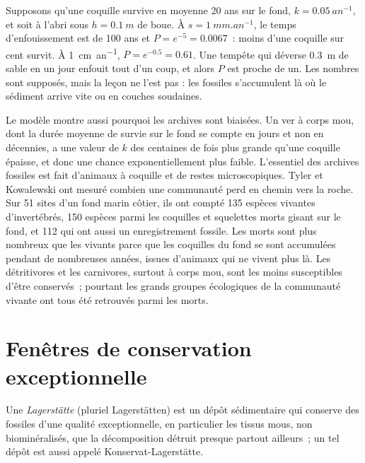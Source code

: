 \begin{example}\label{ex:b2:palaeoenvironments:shell} Supposons
qu'une coquille survive en moyenne 20 ans sur le fond, $k = \qty{0.05}{an^{-1}}$, et soit à
l'abri sous $h = \qty{0.1}{m}$ de boue. À $s = \qty{1}{mm.an^{-1}}$, le temps d'enfouissement
est de 100 ans et $P = e^{-5} = 0.0067$~: moins d'une coquille sur cent survit. À \qty{1}{cm.an^{-1}},
$P = e^{-0.5} = 0.61$. Une tempête qui déverse \qty{0.3}{m} de sable en un jour enfouit
tout d'un coup, et alors $P$ est proche de un. Les nombres sont supposés, mais la leçon ne
l'est pas : les fossiles s'accumulent là où le sédiment arrive vite ou en couches soudaines.
\end{example}

Le modèle montre aussi pourquoi les archives sont biaisées. Un ver à corps mou, dont la durée moyenne de
survie sur le fond se compte en jours et non en décennies, a une valeur de $k$ des centaines de fois plus
grande qu'une coquille épaisse, et donc une chance exponentiellement plus faible. L'essentiel des archives
fossiles est fait d'animaux à coquille et de restes microscopiques. Tyler et Kowalewski ont mesuré combien
une communauté perd en chemin vers la roche. Sur 51 sites d'un fond marin côtier, ils ont compté 135
espèces vivantes d'invertébrés, 150 espèces parmi les coquilles et squelettes morts gisant sur le fond, et
112 qui ont aussi un enregistrement fossile. Les morts sont plus nombreux que les vivants parce que les
coquilles du fond se sont accumulées pendant de nombreuses années, issues d'animaux qui ne vivent plus là.
Les détritivores et les carnivores, surtout à corps mou, sont les moins susceptibles d'être conservés~;
pourtant les grands groupes écologiques de la communauté vivante ont tous été retrouvés parmi les morts.

\section{Fenêtres de conservation exceptionnelle}\label{sec:b2:palaeoenvironments:lagerstatten}

\begin{definition}[Lagerstätte]\label{def:b2:palaeoenvironments:lagerstatte}
Une \emph{Lagerstätte} (pluriel Lagerstätten) est un dépôt sédimentaire qui conserve
des fossiles d'une qualité exceptionnelle, en particulier les tissus mous, non biominéralisés, que la
décomposition détruit presque partout ailleurs~; un tel dépôt est aussi appelé Konservat-Lagerstätte.
\end{definition}

